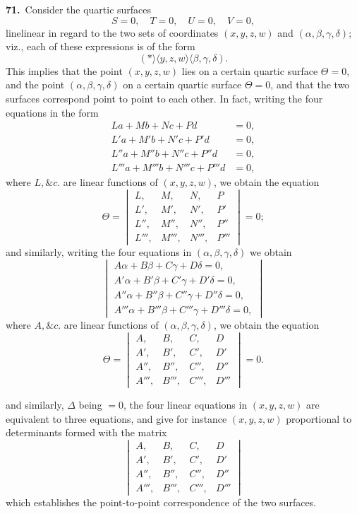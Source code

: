 \documentclass[11pt,a4paper]{article}
\newcommand{\bw}{\mathrel{\rangle\!\langle}}
\begin{document}
\noindent\textbf{71.}\ Consider the quartic surfaces
\[
S = 0,\quad T = 0,\quad U = 0,\quad V = 0,
\]
linelinear in regard to the two sets of coordinates $(x, y, z, w)$ and $(\alpha, \beta, \gamma, \delta)$; viz., each of these expressions is of the form
\[
(\ast \bw y, z, w \bw\beta, \gamma, \delta).
\]
This implies that the point $(x, y, z, w)$ lies on a certain quartic surface $\Theta = 0$, and the point $(\alpha, \beta, \gamma, \delta)$ on a certain quartic surface $\Theta = 0$, and that the two surfaces correspond point to point to each other. In fact, writing the four equations in the form
\begin{align*}
La + Mb + Nc + Pd &= 0,\\
L'a + M'b + N'c + P'd &= 0,\\
L''a + M''b + N''c + P''d &= 0,\\
L'''a + M'''b + N'''c + P'''d &= 0,
\end{align*}
where $L, \&c.$ are linear functions of $(x, y, z, w)$, we obtain the equation
\[
\Theta = \begin{vmatrix}
L, & M, & N, & P\\
L', & M', & N', & P'\\
L'', & M'', & N'', & P''\\
L''', & M''', & N''', & P'''
\end{vmatrix} = 0;
\]
and similarly, writing the four equations in $(\alpha, \beta, \gamma, \delta)$ we obtain
\[
\begin{vmatrix}
A\alpha + B\beta + C\gamma + D\delta = 0,\\
A'\alpha + B'\beta + C'\gamma + D'\delta = 0,\\
A''\alpha + B''\beta + C''\gamma + D''\delta = 0,\\
A'''\alpha + B'''\beta + C'''\gamma + D'''\delta = 0,
\end{vmatrix}
\]
where $A, \&c.$ are linear functions of $(\alpha, \beta, \gamma, \delta)$, we obtain the equation
\[
\Theta = \begin{vmatrix}
A, & B, & C, & D\\
A', & B', & C', & D'\\
A'', & B'', & C'', & D''\\
A''', & B''', & C''', & D'''
\end{vmatrix} = 0.
\]

\newpage
\setcounter{page}{160}

\noindent and similarly, $\Delta$ being $= 0$, the four linear equations in $(x, y, z, w)$ are equivalent to three equations, and give for instance $(x, y, z, w)$ proportional to determinants formed with the matrix
\[
\begin{vmatrix}
A, & B, & C, & D\\
A', & B', & C', & D'\\
A'', & B'', & C'', & D''\\
A''', & B''', & C''', & D'''
\end{vmatrix}
\]
which establishes the point-to-point correspondence of the two surfaces.
\end{document}
